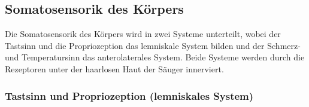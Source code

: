 \documentclass[12pt,a4paper,pdftex]{article}
\begin{document}

\subsection{Somatosensorik  des Körpers}
Die Somatosensorik des Körpers wird in zwei Systeme unterteilt, wobei der Tastsinn  und die Propriozeption das lemniskale System  bilden und der Schmerz- und Temperatursinn  das anterolaterales System.  Beide Systeme werden durch die Rezeptoren unter der haarlosen Haut der Säuger innerviert.

\subsubsection{Tastsinn und Propriozeption (lemniskales System)}
\end{document}
